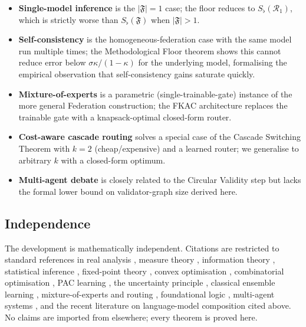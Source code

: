 \documentclass[11pt,twocolumn,a4paper]{article}
\theoremstyle{definition}
\theoremstyle{remark}
\newcommand{\Federation}{\mathfrak{F}}
\newcommand{\receiver}{\mathcal{R}}
\newcommand{\Sfloor}{S_{\flat}}
\newcommand{\catpow}{\kappa}
\newcommand{\disp}{\sigma}
\begin{document}
\begin{itemize}[leftmargin=*,nosep]
\item \textbf{Single-model inference} is the $|\Federation| = 1$ case; the floor reduces to $\Sfloor(\receiver_1)$, which is strictly worse than $\Sfloor(\Federation)$ when $|\Federation| > 1$.
\item \textbf{Self-consistency} \citep{wang2022self} is the homogeneous-federation case with the same model run multiple times; the Methodological Floor theorem shows this cannot reduce error below $\disp\catpow/(1-\catpow)$ for the underlying model, formalising the empirical observation that self-consistency gains saturate quickly.
\item \textbf{Mixture-of-experts} \citep{jacobs1991adaptive,shazeer2017outrageously,fedus2022switch} is a parametric (single-trainable-gate) instance of the more general Federation construction; the FKAC architecture replaces the trainable gate with a knapsack-optimal closed-form router.
\item \textbf{Cost-aware cascade routing} \citep{chen2023frugalgpt,sakota2024fly,ong2024routellm} solves a special case of the Cascade Switching Theorem with $k = 2$ (cheap/expensive) and a learned router; we generalise to arbitrary $k$ with a closed-form optimum.
\item \textbf{Multi-agent debate} \citep{du2023improving,madaan2023self,wang2024mixture} is closely related to the Circular Validity step but lacks the formal lower bound on validator-graph size derived here.
\end{itemize}

\subsection{Independence}

The development is mathematically independent. Citations are restricted to standard references in real analysis \citep{rudin1987real}, measure theory \citep{halmos1950measure,kolmogorov1933foundations}, information theory \citep{shannon1948mathematical,cover2006elements,kullback1951information,kelly1956new}, statistical inference \citep{fisher1925theory,rao1945information}, fixed-point theory \citep{banach1922operations}, convex optimisation \citep{boyd2004convex,nesterov2018lectures}, combinatorial optimisation \citep{karp1972reducibility,dantzig1957discrete,bellman1957dynamic,kellerer2004knapsack,pisinger1997minimal,ibarra1975fast,garey1979computers}, PAC learning \citep{valiant1984theory,vapnik1998statistical,blumer1989learnability,shalev2014understanding}, the uncertainty principle \citep{heisenberg1927uber,robertson1929uncertainty}, classical ensemble learning \citep{dietterich2000ensemble,breiman2001random,freund1997decision,schapire1990strength,wolpert1992stacked}, mixture-of-experts and routing \citep{jacobs1991adaptive,shazeer2017outrageously,fedus2022switch}, foundational logic \citep{godel1931formal,turing1936computable,tarski1933pojecie}, multi-agent systems \citep{wooldridge2009introduction,russell2020artificial,lewis1969convention,aumann1976agreeing}, and the recent literature on language-model composition cited above. No claims are imported from elsewhere; every theorem is proved here.
\end{document}
